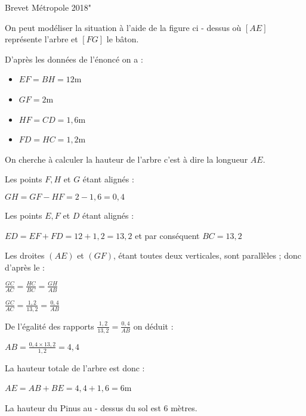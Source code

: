 \begin{corrige}
     \begin{center}
          Brevet Métropole 2018"
     \end{center}
     On peut modéliser la situation à l'aide de la figure ci - dessus où $\left[AE\right]$ représente l'arbre et $\left[FG\right]$ le bâton.
     \par
     D'après les données de l'énoncé on a :
     \begin{itemize}
          \item $EF = BH = 12$m
          \item $GF = 2$m
          \item $HF = CD = 1,6$m
          \item $FD = HC = 1,2$m
     \end{itemize}
     On cherche à calculer la hauteur de l'arbre c'est à dire la longueur $AE$.
     \par
     Les points $F, H$ et $G$ étant alignés :
     \par
     $GH = GF - HF = 2 - 1,6 = 0,4$
     \par
     Les points $E, F$ et $D$ étant alignés :
     \par
     $ED = EF + FD = 12 + 1,2 = 13,2$ et par conséquent $BC = 13,2$
     \par
     Les droites $\left(AE\right)$ et $\left(GF\right)$, étant toutes deux verticales, sont parallèles ; donc d'après le  :
     \par
     $\frac{GC}{AC} = \frac{HC}{BC} = \frac{GH}{AB}$
     \par
     $\frac{GC}{AC} = \frac{1,2}{13,2} = \frac{0,4}{AB}$
     \par
     De l'égalité des rapports $\frac{1,2}{13,2} = \frac{0,4}{AB}$ on déduit :
     \par
     $AB = \frac{0,4\times 13,2}{1,2} = 4,4$
     \par
     La hauteur totale de l'arbre est donc :
     \par
     $AE = AB + BE = 4,4 + 1,6 = 6$m
     \par
     La hauteur du Pinus au - dessus du sol est $6$ mètres.
\end{corrige}
